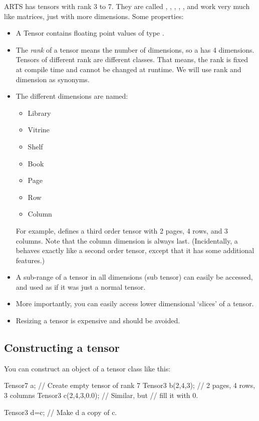 ARTS has tensors with rank 3 to 7. They are called
, , ,
, , and work very much like
matrices, just with more dimensions. Some properties:
\begin{itemize}
\item A Tensor contains floating point values of type .
\item The \emph{rank} of a tensor means the number of dimensions, so a
   has 4 dimensions. Tensors of different rank are
  different classes. That means, the rank is fixed at compile time and
  cannot be changed at runtime. We will use rank and dimension as
  synonyms. 
\item The different dimensions are named:
\begin{itemize}
\item Library
\item Vitrine
\item Shelf
\item Book
\item Page
\item Row
\item Column
\end{itemize}
For example,  defines a third order tensor with 2
pages, 4 rows, and 3 columns. Note that the column dimension is always
last. (Incidentally, a  behaves exactly like a second
order tensor, except that it has some additional features.) 
\item A sub-range of a tensor in all dimensions (sub tensor) can
  easily be accessed, and used as if it was just a normal tensor.
\item More importantly, you can easily access lower dimensional
  `slices' of a tensor. 
\item Resizing a tensor is expensive and should be avoided.
\end{itemize}

\subsection{Constructing a tensor}
You can construct an object of a tensor class like this:

\begin{code}
Tensor7 a;            // Create empty tensor of rank 7
Tensor3 b(2,4,3);     // 2 pages, 4 rows, 3 columns
Tensor3 c(2,4,3,0.0); // Similar, but
                      // fill it with 0.

Tensor3 d=c;          // Make d a copy of c.
\end{code}


